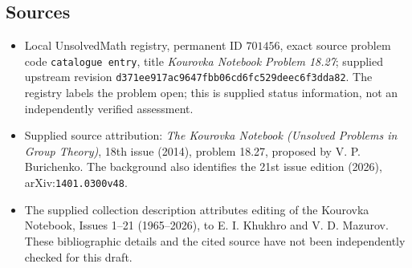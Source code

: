 \documentclass[11pt]{article}
\begin{document}
\subsection{Sources}
\begin{itemize}
\item Local UnsolvedMath registry, permanent ID \(701456\), exact source problem code \texttt{catalogue entry}, title \emph{Kourovka Notebook Problem 18.27}; supplied upstream revision \texttt{d371ee917ac9647fbb06cd6fc529deec6f3dda82}. The registry labels the problem open; this is supplied status information, not an independently verified assessment.
\item Supplied source attribution: \emph{The Kourovka Notebook (Unsolved Problems in Group Theory)}, 18th issue (2014), problem 18.27, proposed by V. P. Burichenko. The background also identifies the 21st issue edition (2026), arXiv:\texttt{1401.0300v48}.
\item The supplied collection description attributes editing of the Kourovka Notebook, Issues 1--21 (1965--2026), to E. I. Khukhro and V. D. Mazurov. These bibliographic details and the cited source have not been independently checked for this draft.
\end{itemize}
\end{document}
